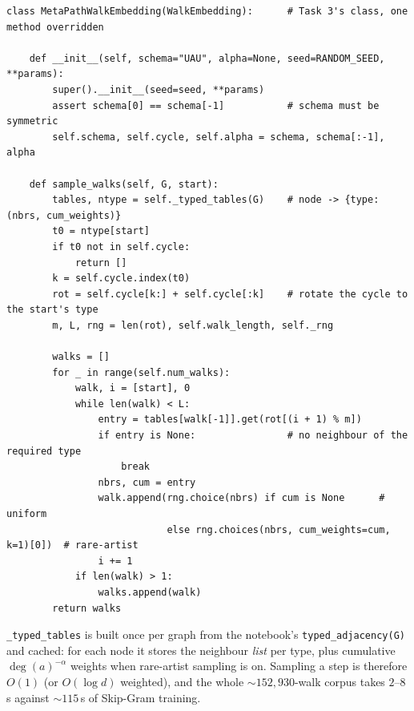 
\begin{lstlisting}[style=p2code,caption={The meta-path sampler. Everything else --- training, link
predictor, country classifier --- is unchanged from Task 3.},captionpos=b,label=p2:lst:sampler]
class MetaPathWalkEmbedding(WalkEmbedding):      # Task 3's class, one method overridden

    def __init__(self, schema="UAU", alpha=None, seed=RANDOM_SEED, **params):
        super().__init__(seed=seed, **params)
        assert schema[0] == schema[-1]           # schema must be symmetric
        self.schema, self.cycle, self.alpha = schema, schema[:-1], alpha

    def sample_walks(self, G, start):
        tables, ntype = self._typed_tables(G)    # node -> {type: (nbrs, cum_weights)}
        t0 = ntype[start]
        if t0 not in self.cycle:
            return []
        k = self.cycle.index(t0)
        rot = self.cycle[k:] + self.cycle[:k]    # rotate the cycle to the start's type
        m, L, rng = len(rot), self.walk_length, self._rng

        walks = []
        for _ in range(self.num_walks):
            walk, i = [start], 0
            while len(walk) < L:
                entry = tables[walk[-1]].get(rot[(i + 1) % m])
                if entry is None:                # no neighbour of the required type
                    break
                nbrs, cum = entry
                walk.append(rng.choice(nbrs) if cum is None      # uniform
                            else rng.choices(nbrs, cum_weights=cum, k=1)[0])  # rare-artist
                i += 1
            if len(walk) > 1:
                walks.append(walk)
        return walks
\end{lstlisting}

\noindent
\texttt{\_typed\_tables} is built once per graph from the notebook's
\texttt{typed\_adjacency(G)} and cached: for each node it stores the neighbour
\emph{list} per type, plus cumulative $\deg(a)^{-\alpha}$ weights when rare-artist
sampling is on.  Sampling a step is therefore $O(1)$ (or $O(\log d)$ weighted), and the
whole $\sim\!152{,}930$-walk corpus takes $2$--$8\,$s against $\sim\!115\,$s of Skip-Gram
training.

